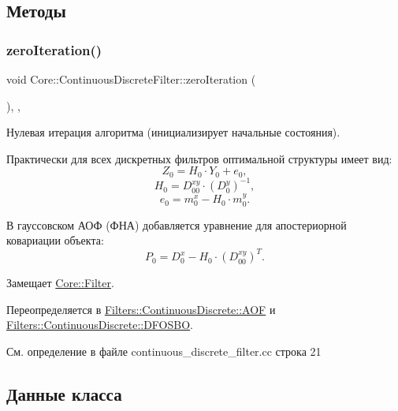 \subsection{Методы}
\hypertarget{class_core_1_1_continuous_discrete_filter_acc9b18241a13d46dc92ef1f02ec13e53}{}\label{class_core_1_1_continuous_discrete_filter_acc9b18241a13d46dc92ef1f02ec13e53} 
\subsubsection{\texorpdfstring{zero\+Iteration()}{zeroIteration()}}
{\footnotesize\ttfamily void Core\+::\+Continuous\+Discrete\+Filter\+::zero\+Iteration (\begin{DoxyParamCaption}{ }\end{DoxyParamCaption})\hspace{0.3cm}{\ttfamily [override]}, {\ttfamily [protected]}, {\ttfamily [virtual]}}



Нулевая итерация алгоритма (инициализирует начальные состояния). 

Практически для всех дискретных фильтров оптимальной структуры имеет вид\+: \[Z_0 = H_0 \cdot Y_0 + e_0,\] \[H_0 = D_{00}^{xy} \cdot (D_0^y)^{-1},\] \[e_0 = m_0^x - H_0 \cdot m_0^y.\]

В гауссовском АОФ (ФНА) добавляется уравнение для апостериорной ковариации объекта\+: \[P_0 = D_0^x - H_0 \cdot (D_{00}^{xy})^T.\] 

Замещает \hyperlink{class_core_1_1_filter_af95880b734c4b8dc3d8c02f222b32506}{Core\+::\+Filter}.



Переопределяется в \hyperlink{class_filters_1_1_continuous_discrete_1_1_a_o_f_ab350a4de87a9e2c2e8b01e178d61f3b5}{Filters\+::\+Continuous\+Discrete\+::\+A\+OF} и \hyperlink{class_filters_1_1_continuous_discrete_1_1_d_f_o_s_b_o_a958c75df5031558a244d553f13376e75}{Filters\+::\+Continuous\+Discrete\+::\+D\+F\+O\+S\+BO}.



См. определение в файле continuous\+\_\+discrete\+\_\+filter.\+cc строка 21



\subsection{Данные класса}
\hypertarget{class_core_1_1_continuous_discrete_filter_a14b9176c461ca407005e653ecc987b1b}{}\label{class_core_1_1_continuous_discrete_filter_a14b9176c461ca407005e653ecc987b1b} 
